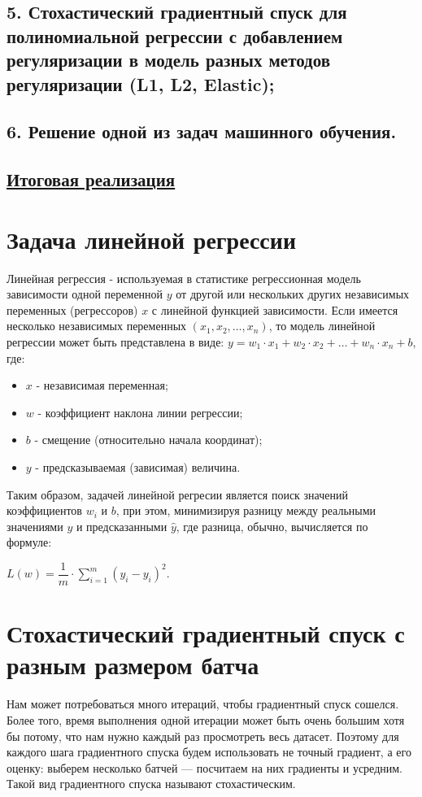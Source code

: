 \documentclass{article}
\begin{document}
\subsection*{5. Стохастический градиентный спуск для полиномиальной регрессии с добавлением регуляризации в модель разных методов регуляризации (L1, L2, Elastic);}
\subsection*{6. Решение одной из задач машинного обучения.}
\subsection*{\href{https://gitfront.io/r/Vitaliy-X-0/TLNs9s2iAaGd/MetOpt/}{Итоговая реализация}}

\newpage
\section*{Задача линейной регрессии}
Линейная регрессия - используемая в статистике регрессионная модель зависимости одной переменной $y$ от другой или нескольких других независимых переменных (регрессоров) $x$ с линейной функцией зависимости. Если имеется несколько независимых переменных $(x_1, x_2, \dots, x_n)$, то модель линейной регрессии может быть представлена в виде: $y = w_1 \cdot x_1 + w_2 \cdot x_2 + \dots + w_n \cdot x_n + b$, где:
\begin{itemize}
    \item $x$ - независимая переменная;
    \item $w$ - коэффициент наклона линии регрессии;
    \item $b$ - смещение (относительно начала координат);
    \item $y$ - предсказываемая (зависимая) величина.
\end{itemize}
Таким образом, задачей линейной регресии является поиск значений коэффициентов $w_i$ и $b$, при этом, минимизируя разницу между реальными значениями $y$ и предсказанными $\hat{y}$, где разница, обычно, вычисляется по формуле:
\begin{center}
    $L(w) = \dfrac{1}{m} \cdot \displaystyle \sum_{i=1}^{m}{(\hat{y_i} - y_i)^2}$.
\end{center}

\section*{Стохастический градиентный спуск с разным размером батча}
Нам может потребоваться много итераций, чтобы градиентный спуск сошелся. Более того, время выполнения одной итерации может быть очень большим хотя бы потому, что нам нужно каждый раз просмотреть весь датасет. Поэтому для каждого шага градиентного спуска будем использовать не точный градиент, а его оценку: выберем несколько батчей — посчитаем на них градиенты и усредним. Такой вид градиентного спуска называют стохастическим. \\
\end{document}
